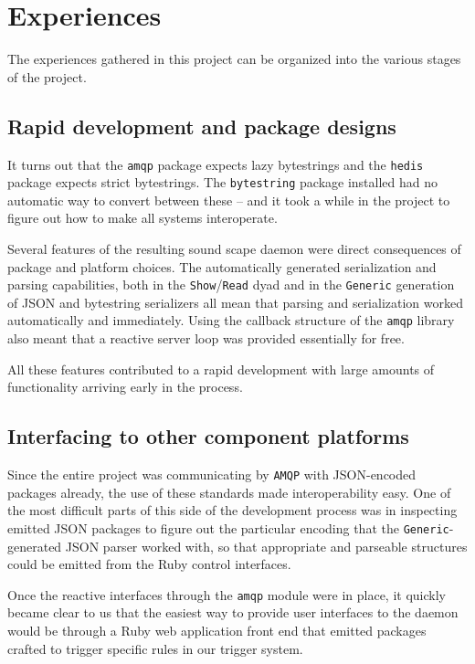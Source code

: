 \section{Experiences}
\label{sec:experiences}

The experiences gathered in this project can be organized into the various
stages of the project.

\subsection{Rapid development and package designs}
\label{sec:rapid-devel-pack}

It turns out that the \texttt{amqp} package expects lazy bytestrings
and the \texttt{hedis} package expects strict bytestrings. The
\texttt{bytestring} package installed had no automatic way to convert
between these -- and it took a while in the project to figure out how
to make all systems interoperate.

Several features of the resulting sound scape daemon were
direct consequences of package and platform choices. The automatically
generated serialization and parsing capabilities, both in the
\texttt{Show}/\texttt{Read} dyad and in the \texttt{Generic}
generation of JSON and bytestring serializers all mean that parsing
and serialization worked automatically and immediately. Using the
callback structure of the \texttt{amqp} library also meant that a
reactive server loop was provided essentially for free.

All these features contributed to a rapid development with large
amounts of functionality arriving early in the process.

\subsection{Interfacing to other component platforms}
\label{sec:interf-other-comp}

Since the entire project was communicating by \texttt{AMQP} with JSON-encoded
packages already, the use of these standards made interoperability
easy. One of the most difficult parts of this side of the development
process was in inspecting emitted JSON packages to figure out the
particular encoding that the \texttt{Generic}-generated JSON parser
worked with, so that appropriate and parseable structures could be
emitted from the Ruby control interfaces.

Once the reactive interfaces through the \texttt{amqp} module were in
place, it quickly became clear to us that the easiest way to provide user
interfaces to the daemon would be through a Ruby web application
front end that emitted packages crafted to trigger specific rules in
our trigger system. 

